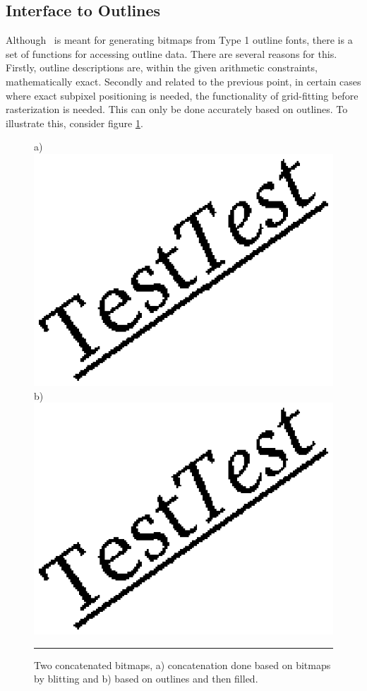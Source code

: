\subsection{Interface to Outlines}
\label{outlines}%
Although \tonelib\ is meant for generating bitmaps from Type 1 outline fonts,
there is a set of functions for accessing outline data. 
There are several reasons for this. Firstly, outline
descriptions are, within the given arithmetic constraints, mathematically exact.
Secondly and related to the previous point, in certain cases where exact
subpixel positioning is needed, the functionality of grid-fitting before
rasterization is needed. This can only be done accurately based on
outlines. To illustrate this, consider figure \ref{figure:whyoutlines}.
%
\begin{figure}[t]
\hfill
a) \includegraphics[scale=1.0]{concatglyphs.eps}
\hfill
b) \includegraphics[scale=1.0]{concatoutlines.eps}
\hfill\break
\vskip3mm
\hrule\vskip3mm\small
\caption{\label{figure:whyoutlines}Two concatenated bitmaps, a) concatenation
  done based on bitmaps by blitting and b) based on outlines and then filled.} 
\end{figure}
